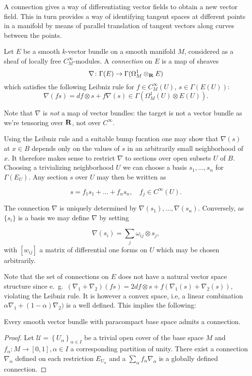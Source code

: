\documentclass[a4paper,openany]{scrbook}
\begin{document}
A connection gives a way of differentiating vector fields to obtain a new vector field. This in turn provides a way of identifying tangent spaces at different points in a manifold by means of parallel translation of tangent vectors along curves between the points.

\begin{defn}
Let $E$ be a smooth $k$-vector bundle on a smooth manifold $M$, considered as a sheaf of locally free $C^\infty_M$-modules. A \emph{connection} on $E$ is a map of sheaves
\[
\nabla\colon \Gamma (E) \to \Gamma (\Omega^1_M \otimes_\mathbf R E)
\]
which satisfies the following Leibniz rule for $f \in C^\infty_M(U)$, $s \in \Gamma (E(U))$:
\[
\nabla(fs) = df \otimes s + f \nabla(s) \in \Gamma( \Omega^1_M(U) \otimes E(U)).
\]
\end{defn}
Note that $\nabla$ is \emph{not} a map of vector bundles: the target is not a vector bundle as we're tensoring over $\mathbf R$, not over $C^\infty$.

Using the Leibniz rule and a suitable bump fucntion one may show that $\nabla(s)$ at $x \in B$ depends only on the values of $s$ in an arbitrarily small neighborhood of $x$. It therefore makes sense to restrict $\nabla$ to sections over open subsets $U$ of $B$. Choosing a trivializing neighborhood $U$ we can choose a basis $s_1,\dots,s_n$ for $\Gamma (E_U)$. Any section $s$ over $U$ may then be written as

\begin{equation*}
s=f_1s_1 + \dots + f_ns_n, \quad f_j \in C^{\infty}(U).
\end{equation*}

The connection $\nabla$ is uniquely determined by $\nabla(s_1),\dots,\nabla(s_n)$. Conversely, as $\{s_i\}$ is a basis we may define $\nabla$ by setting

\begin{equation*}
\nabla (s_i)=\sum_j \omega_{ij}\otimes s_j,
\end{equation*} with $[w_{ij}]$ a matrix of differential one forms on $U$ which may be chosen arbitrarily.

Note that the set of connections on $E$ does not have a natural vector space structure since e.~g.\  $(\nabla_1 + \nabla_2)(fs)=2df\otimes s + f(\nabla_1(s) + \nabla_2(s))$, violating the Leibniz rule. It is however a convex space, i.e, a linear combination $\alpha\nabla_1 + (1-\alpha)\nabla_2)$ is a well defined. This implies the following:

\begin{prop}
Every smooth vector bundle with paracompact base space admits a connection.
\end{prop}
\begin{proof}
Let $\mathcal{U} = \left\{U_{\alpha}\right\}_{\alpha \in I}$ be a trivial open cover of the base space $M$ and $f_{\alpha} : M \rightarrow [0,1], \alpha \in I$ a corresponding partition of unity. There exist a connection $\nabla_\alpha$ defined on each restriction $E_{U_{\alpha}}$ and a $\sum_{\alpha} f_{\alpha} \nabla_{\alpha}$ is a globally defined connection.
\end{proof}
\end{document}
